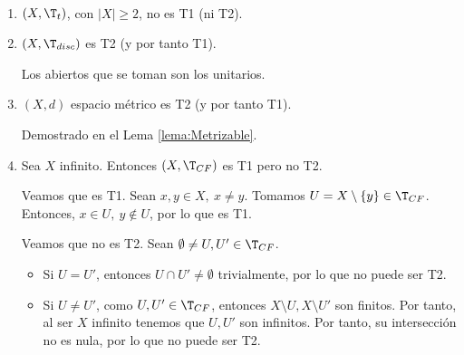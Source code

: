 \begin{ejemplo}\
\begin{enumerate}
    \item $(X,\T_t)$, con $|X|\geq 2$, no es T1 (ni T2).
    \item $(X,\T_{disc})$ es T2 (y por tanto T1).
    
    Los abiertos que se toman son los unitarios.
    \item $(X,d)$ espacio métrico es T2 (y por tanto T1).

    Demostrado en el Lema \ref{lema:Metrizable}.

    \item Sea $X$ infinito. Entonces $(X,\T_{CF})$ es T1 pero no T2.

    Veamos que es T1. Sean $x,y\in X,~x\neq y$. Tomamos $U=X\setminus \{y\}\in \T_{CF}$. Entonces, $x\in U,~y\notin U$, por lo que es T1.

    Veamos que no es T2. Sean $\emptyset\neq U, U'\in \T_{CF}$.
    \begin{itemize}
        \item Si $U=U'$, entonces $U\cap U'\neq \emptyset$ trivialmente, por lo que no puede ser T2.
        \item Si $U\neq U'$, como $U,U'\in \T_{CF}$, entonces $X\setminus U,X\setminus U'$ son finitos. Por tanto, al ser $X$ infinito tenemos que $U,U'$ son infinitos. Por tanto, su intersección no es nula, por lo que no puede ser T2.
    \end{itemize}
\end{enumerate}
\end{ejemplo}

